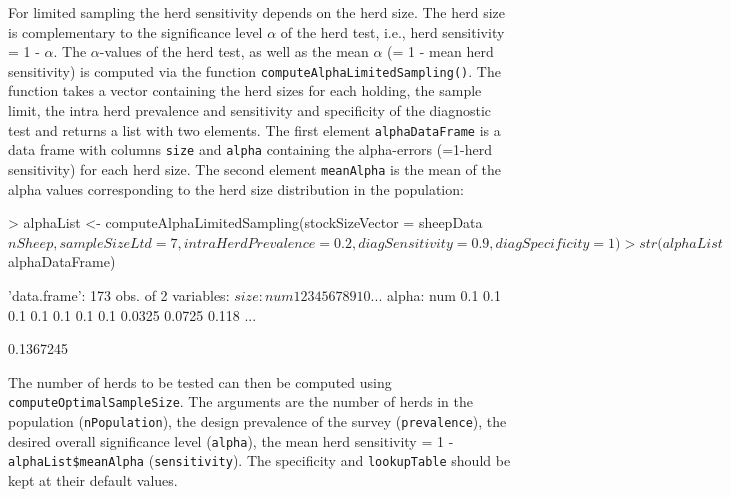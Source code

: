 \documentclass[nojss]{jss}
\begin{document}
For limited sampling the herd sensitivity depends on the herd size. 
The herd size is complementary to the significance level $\alpha$ of 
the herd test, i.e., herd sensitivity = 1 - $\alpha$. The 
$\alpha$-values of the herd test, as well as the mean $\alpha$ (= 1 
- mean herd sensitivity) is computed via the function 
\texttt{computeAlphaLimitedSampling()}. 
 The function takes a 
vector containing the herd sizes for each holding, the sample limit, 
the intra herd prevalence and sensitivity and specificity of the 
diagnostic test and returns a list with two elements. The first 
element \texttt{alphaDataFrame} is a data frame with columns 
\texttt{size} and \texttt{alpha} containing the alpha-errors 
(=1-herd sensitivity) for each herd size. The second element 
\texttt{meanAlpha} is the mean of the alpha values corresponding to 
the herd size distribution in the population: 

\begin{Schunk}
\begin{Sinput}
> alphaList <- computeAlphaLimitedSampling(stockSizeVector = sheepData$nSheep, 
       sampleSizeLtd = 7, intraHerdPrevalence = 0.2, diagSensitivity = 0.9, 
       diagSpecificity = 1)
> str(alphaList$alphaDataFrame) 
\end{Sinput}
\begin{Soutput}
'data.frame':	173 obs. of  2 variables:
 $ size : num  1 2 3 4 5 6 7 8 9 10 ...
 $ alpha: num  0.1 0.1 0.1 0.1 0.1 0.1 0.1 0.0325 0.0725 0.118 ...
\end{Soutput}
\begin{Soutput}
[1] 0.1367245
\end{Soutput}
\end{Schunk}

The number of herds to be tested can then be computed using 
\texttt{computeOptimalSampleSize}. The arguments are the number of 
herds in the population (\texttt{nPopulation}), the design 
prevalence of the survey (\texttt{prevalence}), the desired overall 
significance level (\texttt{alpha}), the mean herd sensitivity = 1 - 
\texttt{alphaList\$meanAlpha} (\texttt{sensitivity}). The specificity and 
\texttt{lookupTable} should be kept at their default values.


%
%
\end{document}

